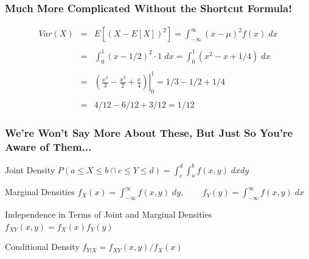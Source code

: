 \documentclass[handout]{beamer}
\begin{document}
\begin{frame}
\frametitle{Much More Complicated Without the Shortcut Formula!}
\begin{eqnarray*}
 Var(X) &=& E\left[ \left( X - E[X] \right)^2\right] = \int_{-\infty}^{\infty} (x - \mu)^2 f(x) \; dx\\ \\
 	&=&\int_{0}^{1} (x -1/2)^2 \cdot 1 \; dx = \int_{0}^{1} (x^2  - x + 1/4) \; dx \\ \\
 		&=& \left. \left(\frac{x^3}{3} - \frac{x^2}{2} + \frac{x}{4}  \right)\right|_0^1 = 1/3 - 1/2 + 1/4\\ \\ 
 			&=& 4/12 - 6/12 + 3/12 = 1/12
\end{eqnarray*}
\end{frame}

\begin{frame}
\frametitle{We're Won't Say More About These, But Just So You're Aware of Them...}

\begin{block}{Joint Density}
$ \displaystyle P(a\leq X \leq b \cap c\leq Y \leq d) = \int_c^d \int_a^b f(x,y) \; dxdy$
\end{block}
\begin{block}{Marginal Densities}
$f_X(x) = \int_{-\infty}^\infty f(x,y)\; dy$, $\;\;\;\;\;\;\; f_Y(y) = \int_{-\infty}^\infty f(x,y)\; dx$
\end{block}
\begin{block}{Independence in Terms of Joint and Marginal Densities}
$f_{XY}(x,y) = f_X(x)f_Y(y)$
\end{block}
\begin{block}{Conditional Density}
$f_{Y|X} = f_{XY}(x,y)/f_X(x)$
\end{block}

\end{frame}
\end{document}
